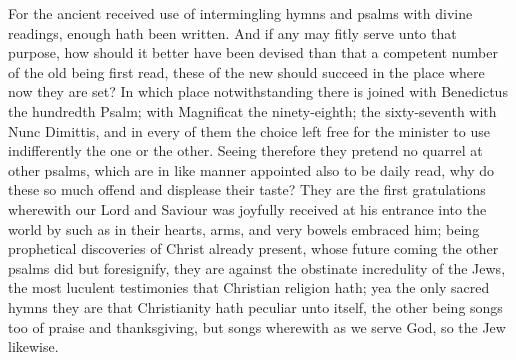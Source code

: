 For the ancient received use of intermingling hymns and psalms with divine readings, enough hath been written. And if any may fitly serve unto that purpose, how should it better have been devised than that a competent number of the old being first read, these of the new should succeed in the place where now they are set? In which place notwithstanding there is joined with Benedictus the hundredth Psalm; with Magnificat the ninety-eighth; the sixty-seventh with Nunc Dimittis, and in every of them the choice left free for the minister to use indifferently the one or the other. Seeing therefore they pretend no quarrel at other psalms, which are in like manner appointed also to be daily read, why do these so much offend and displease their taste? They are the first gratulations wherewith our Lord and Saviour was joyfully received at his entrance into the world by such as in their hearts, arms, and very bowels embraced him; being prophetical  discoveries of Christ already present, whose future coming the other psalms did but foresignify, they are against the obstinate incredulity of the Jews, the most luculent testimonies that Christian religion hath; yea the only sacred hymns they are that Christianity hath peculiar unto itself, the other being songs too of praise and thanksgiving, but songs wherewith as we serve God, so the Jew likewise.
